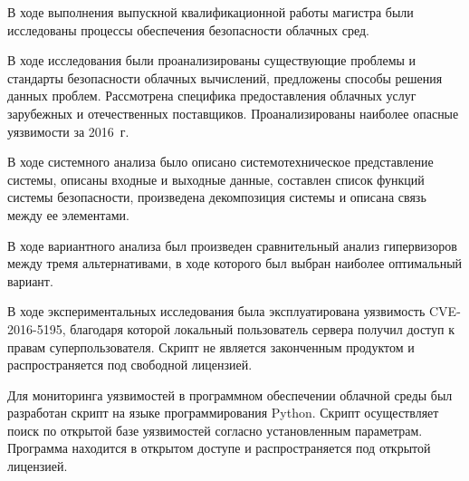 
В ходе выполнения выпускной квалификационной работы магистра были исследованы процессы обеспечения безопасности облачных сред.

В ходе исследования были проанализированы существующие проблемы и стандарты безопасности облачных вычислений, предложены способы решения данных проблем.
Рассмотрена специфика предоставления облачных услуг зарубежных и отечественных поставщиков.
Проанализированы наиболее опасные уязвимости за 2016~г.

В ходе системного анализа было описано системотехническое представление системы, описаны входные и выходные данные, составлен список функций системы безопасности, произведена декомпозиция системы и описана связь между ее элементами.

В ходе вариантного анализа был произведен сравнительный анализ гипервизоров между тремя альтернативами, в ходе которого был выбран наиболее оптимальный вариант.

В ходе экспериментальных исследования была эксплуатирована уязвимость CVE-2016-5195, благодаря которой локальный пользователь сервера получил доступ к правам суперпользователя.
Скрипт не является законченным продуктом и распространяется под свободной лицензией.

Для мониторинга уязвимостей в программном обеспечении облачной среды был разработан скрипт на языке программирования Python.
Скрипт осуществляет поиск по открытой базе уязвимостей согласно установленным параметрам.
Программа находится в открытом доступе и распространяется под открытой лицензией.

\clearpage
